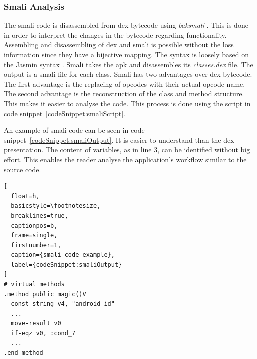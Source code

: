 \subsubsection{Smali Analysis} \label{subsection:tools-baksmali}
The smali code is disassembled from dex bytecode using \textit{baksmali} \cite{smali}.
This is done in order to interpret the changes in the bytecode regarding functionality.
\newline
Assembling and disassembling of dex and smali is possible without the loss information since they have a bijective mapping\cite{smali}.
The syntax is loosely based on the Jasmin syntax \cite{smali}.
Smali takes the \gls{apk} and disassembles its \textit{classes.dex} file.
The output is a smali file for each class.
Smali has two advantages over dex bytecode.
The first advantage is the replacing of opcodes with their actual opcode name.
The second advantage is the reconstruction of the class and method structure.
This makes it easier to analyse the code.
This process is done using the script in code snippet~\ref{codeSnippet:smaliScript}.
\newline

An example of smali code can be seen in code snippet~\ref{codeSnippet:smaliOutput}.
It is easier to understand than the dex presentation.
The content of variables, as in line 3, can be identified without big effort.
This enables the reader analyse the application's workflow similar to the source code.
\newline
\begin{lstlisting}[
  float=h,
  basicstyle=\footnotesize,
  breaklines=true,
  captionpos=b,
  frame=single,
  firstnumber=1,
  caption={smali code example},
  label={codeSnippet:smaliOutput}
]
# virtual methods
.method public magic()V
  const-string v4, "android_id"
  ...
  move-result v0
  if-eqz v0, :cond_7
  ...
.end method
\end{lstlisting}
